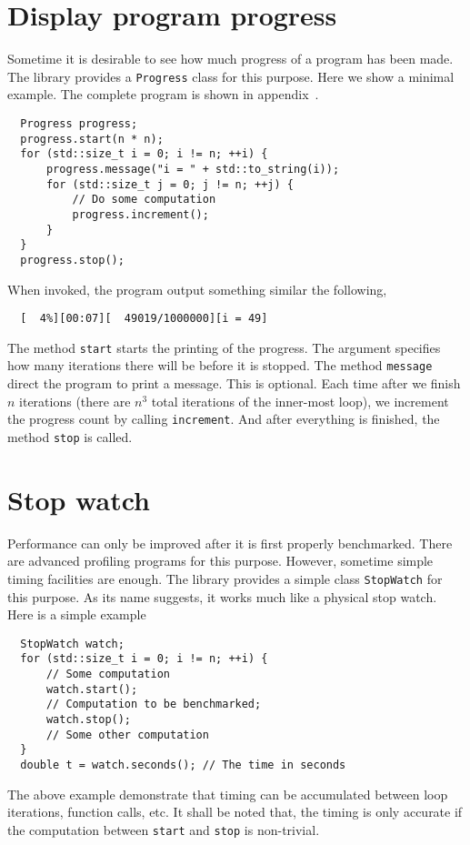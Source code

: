 \section{Display program progress}
\label{sec:Display program progress}

Sometime it is desirable to see how much progress of a program has been made.
The library provides a \verb|Progress| class for this purpose. Here we show a
minimal example. The complete program is shown in
appendix~.
\begin{Verbatim}
  Progress progress;
  progress.start(n * n);
  for (std::size_t i = 0; i != n; ++i) {
      progress.message("i = " + std::to_string(i));
      for (std::size_t j = 0; j != n; ++j) {
          // Do some computation
          progress.increment();
      }
  }
  progress.stop();
\end{Verbatim}
When invoked, the program output something similar the following,
\begin{Verbatim}
  [  4%][00:07][  49019/1000000][i = 49]
\end{Verbatim}
The method \verb|start| starts the printing of the progress. The argument
specifies how many iterations there will be before it is stopped. The method
\verb|message| direct the program to print a message. This is optional. Each
time after we finish $n$ iterations (there are $n^3$ total iterations of the
inner-most loop), we increment the progress count by calling \verb|increment|.
And after everything is finished, the method \verb|stop| is called.

\section{Stop watch}
\label{sec:Stop watch}

Performance can only be improved after it is first properly benchmarked. There
are advanced profiling programs for this purpose. However, sometime simple
timing facilities are enough. The library provides a simple class
\verb|StopWatch| for this purpose. As its name suggests, it works much like a
physical stop watch. Here is a simple example
\begin{Verbatim}
  StopWatch watch;
  for (std::size_t i = 0; i != n; ++i) {
      // Some computation
      watch.start();
      // Computation to be benchmarked;
      watch.stop();
      // Some other computation
  }
  double t = watch.seconds(); // The time in seconds
\end{Verbatim}
The above example demonstrate that timing can be accumulated between loop
iterations, function calls, etc. It shall be noted that, the timing is only
accurate if the computation between \verb|start| and \verb|stop| is
non-trivial.
